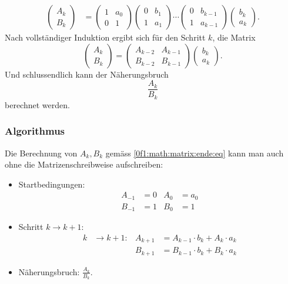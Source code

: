 \begin{align*}
	\begin{pmatrix}
		A_k\\
		B_k
	\end{pmatrix}
	&=
	\begin{pmatrix}
		1& a_0\\
		0& 1
	\end{pmatrix}
	\begin{pmatrix}
		0& b_1\\
		1& a_1
	\end{pmatrix}
	\cdots
	\begin{pmatrix}
		0& b_{k-1}\\
		1& a_{k-1}
	\end{pmatrix}
	\begin{pmatrix}
		b_k\\
		a_k
	\end{pmatrix}.
\end{align*}
Nach vollständiger Induktion ergibt sich für den Schritt $k$, die Matrix
\begin{equation}
	\label{0f1:math:matrix:ende:eq}
	 \begin{pmatrix}
		A_{k}\\
		B_{k}			
	\end{pmatrix} 
	=
		\begin{pmatrix}
		A_{k-2}& A_{k-1}\\
		B_{k-2}& B_{k-1}			
	\end{pmatrix}
		\begin{pmatrix}
		b_k\\
		a_k
	\end{pmatrix}.
\end{equation}
Und schlussendlich kann der Näherungsbruch
\[
\frac{A_k}{B_k}
\] 
berechnet werden.


\subsubsection{Algorithmus}
Die Berechnung von $A_k, B_k$ gemäss \eqref{0f1:math:matrix:ende:eq} kann man auch ohne die Matrizenschreibweise \cite{0f1:kettenbrueche} aufschreiben:
\begin{itemize}
\item Startbedingungen:
\begin{align*}
A_{-1} &= 0		&		A_0 &= a_0 \\
B_{-1} &= 1		&		B_0 &= 1 
\end{align*}
\item Schritt $k\to k+1$:
\[
\begin{aligned}
\label{0f1:math:loesung:eq}
k &\rightarrow k + 1:
&
A_{k+1} &= A_{k-1} \cdot b_k + A_k \cdot a_k \\
&&
B_{k+1} &= B_{k-1} \cdot b_k + B_k \cdot a_k
\end{aligned}
\]
\item
Näherungsbruch: \qquad$\displaystyle\frac{A_k}{B_k}$.
\end{itemize}

